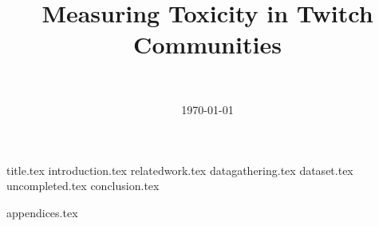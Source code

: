 \documentclass[final]{report}
\title{Measuring Toxicity in Twitch Communities}
\author{~}
\date{\today}
\begin{document}

{title.tex}
\newpage
{}\label{ch:contents}
\tableofcontents
\newpage
{}
{introduction.tex}
{relatedwork.tex}
{datagathering.tex}
{dataset.tex}
{uncompleted.tex}
{conclusion.tex}
\newpage
{}

\printbibliography
{appendices.tex}
\end{document}
